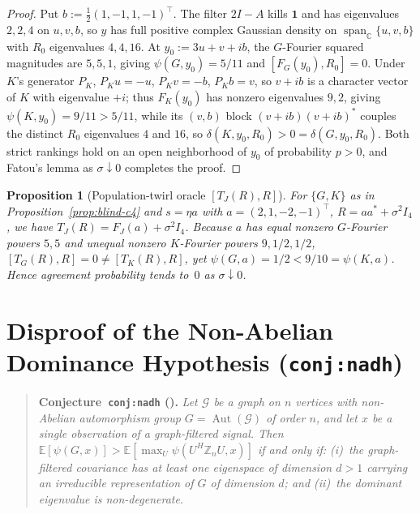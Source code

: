 \documentclass[11pt]{article}
\theoremstyle{plain}
\newtheorem{proposition}[theorem]{Proposition}
\theoremstyle{definition}
\theoremstyle{remark}
\DeclareMathOperator{\Aut}{Aut}
\DeclareMathOperator{\spn}{span}
\begin{document}
\begin{proof}
Put $b := \frac{1}{2}(1, -1, 1, -1)^\top$. The filter $2I - A$ kills $\mathbf{1}$ and has eigenvalues $2, 2, 4$ on $u, v, b$, so $y$ has full positive complex Gaussian density on $\spn_{\mathbb{C}}\{u, v, b\}$ with $R_0$ eigenvalues $4, 4, 16$. At $y_0 := 3u + v + ib$, the $G$-Fourier squared magnitudes are $5, 5, 1$, giving $\psi(G, y_0) = 5/11$ and $[F_G(y_0), R_0] = 0$. Under $K$'s generator $P_K$, $P_K u = -u$, $P_K v = -b$, $P_K b = v$, so $v + ib$ is a character vector of $K$ with eigenvalue $+i$; thus $F_K(y_0)$ has nonzero eigenvalues $9, 2$, giving $\psi(K, y_0) = 9/11 > 5/11$, while its $(v, b)$ block $(v+ib)(v+ib)^*$ couples the distinct $R_0$ eigenvalues $4$ and $16$, so $\delta(K, y_0, R_0) > 0 = \delta(G, y_0, R_0)$. Both strict rankings hold on an open neighborhood of $y_0$ of probability $p > 0$, and Fatou's lemma as $\sigma \downarrow 0$ completes the proof.
\end{proof}

\begin{proposition}[Population-twirl oracle {$[T_J(R), R]$}]\label{prop:blind-pop}
For $\{G, K\}$ as in Proposition~\ref{prop:blind-c4} and $s = \eta a$ with $a = (2, 1, -2, -1)^\top$, $R = aa^* + \sigma^2 I_4$, we have $T_J(R) = F_J(a) + \sigma^2 I_4$. Because $a$ has equal nonzero $G$-Fourier powers $5, 5$ and unequal nonzero $K$-Fourier powers $9, 1/2, 1/2$, $[T_G(R), R] = 0 \neq [T_K(R), R]$, yet $\psi(G, a) = 1/2 < 9/10 = \psi(K, a)$. Hence agreement probability tends to~$0$ as $\sigma \downarrow 0$.
\end{proposition}

\section{Disproof of the Non-Abelian Dominance Hypothesis (\texttt{conj:nadh})}

\begin{quote}
\textbf{Conjecture~\texttt{conj:nadh} (\cite{Thornton2026}).}
\emph{Let $\mathcal{G}$ be a graph on $n$ vertices with non-Abelian automorphism group $G = \Aut(\mathcal{G})$ of order $n$, and let $x$ be a single observation of a graph-filtered signal. Then $\mathbb{E}[\psi(G, x)] > \mathbb{E}[\max_{U} \psi(U^H \mathbb{Z}_n U, x)]$ if and only if: \textup{(i)}~the graph-filtered covariance has at least one eigenspace of dimension $d > 1$ carrying an irreducible representation of $G$ of dimension $d$; and \textup{(ii)}~the dominant eigenvalue is non-degenerate.}
\end{quote}
\end{document}
